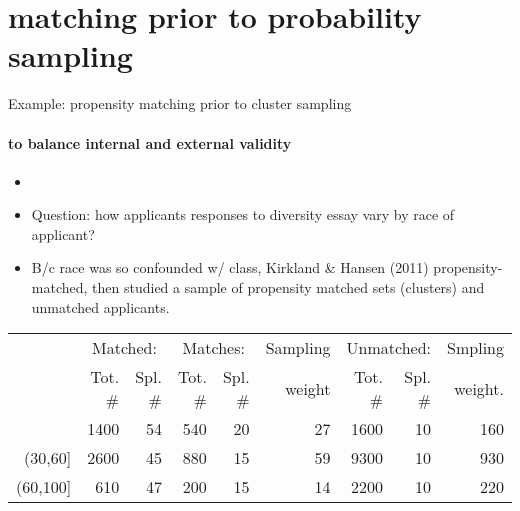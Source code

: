 \section{matching prior to probability sampling}


\begin{frame}{Example: propensity matching prior to cluster sampling}
  \framesubtitle{to balance internal and external validity}
  \begin{itemize}[<+->]
  \item {}
\item Question: how applicants responses to diversity essay vary by
  race of applicant?
\item B/c race was so confounded w/ class, Kirkland \& Hansen (2011)
  propensity-matched, then studied a sample of propensity matched
  sets (clusters) and unmatched applicants.
  \end{itemize}
  
  \addtolength{\tabcolsep}{-\tabcolsepadj}
  {\footnotesize
  \begin{center}
\begin{tabular}{rrrrrrrrr}
  \hline & \multicolumn{2}{c}{Matched:} & \multicolumn{2}{c}{Matches:} & \multicolumn{1}{c}{Sampling} & \multicolumn{2}{c}{Unmatched:} & \multicolumn{1}{c}{Smpling} \\ & Tot. \# & Spl. \# & Tot. \# & Spl. \# & weight & Tot. \# & Spl. \# & weight. \\ 
  \hline
[0,30] & 1400 & 54 & 540 & 20 & 27 & 1600 & 10 & 160 \\ 
  (30,60] & 2600 & 45 & 880 & 15 & 59 & 9300 & 10 & 930 \\ 
  (60,100] & 610 & 47 & 200 & 15 & 14 & 2200 & 10 & 220 \\ 
   \hline
\end{tabular}
\end{center}
}
  \addtolength{\tabcolsep}{\tabcolsepadj}
\end{frame}


